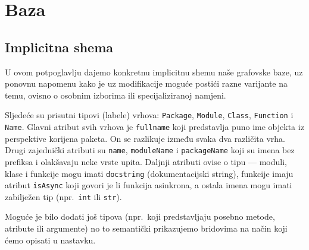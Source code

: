 \section{Baza}

\subsection{Implicitna shema} \label{subsec:implicitna}
U ovom potpoglavlju dajemo konkretnu implicitnu shemu naše grafovske baze,
uz ponovnu napomenu kako je uz modifikacije moguće postići razne varijante na temu,
ovisno o osobnim izborima ili specijaliziranoj namjeni.

Sljedeće su prisutni tipovi (labele) vrhova: \texttt{Package},
\texttt{Module}, \texttt{Class}, \texttt{Function} i \texttt{Name}.
Glavni atribut svih vrhova je \texttt{fullname} koji predstavlja
puno ime objekta iz perspektive korijena paketa. On se razlikuje između
svaka dva različita vrha. Drugi zajednički atributi su \texttt{name},
\texttt{moduleName} i \texttt{packageName} koji su imena
bez prefiksa i olakšavaju neke vrste upita. Daljnji atributi ovise o
tipu --- moduli, klase i funkcije mogu imati \texttt{docstring} (dokumentacijski string),
funkcije imaju atribut \texttt{isAsync} koji govori je li funkcija asinkrona, a
ostala imena mogu imati zabilježen tip (npr.\ \texttt{int} ili \texttt{str}).

Moguće je bilo dodati još tipova (npr.\ koji predstavljaju posebno metode,
atribute ili argumente) no to semantički prikazujemo bridovima na način koji ćemo opisati
u nastavku.

